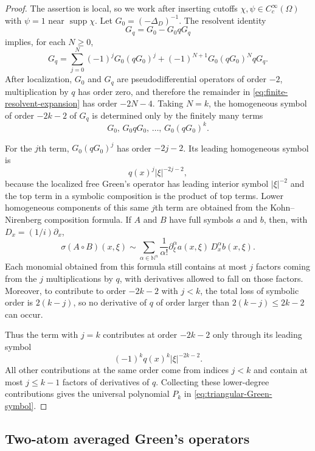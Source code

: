 \documentclass[11pt]{article}
\newcommand{\OmegaD}{\Omega}
\newcommand{\supp}{\operatorname{supp}}
\theoremstyle{plain}
\theoremstyle{definition}
\theoremstyle{remark}
\begin{document}
\begin{proof}
The assertion is local, so we work after inserting cutoffs
$\chi,\psi\in C_c^\infty(\OmegaD)$ with $\psi=1$ near $\supp\chi$.
Let $G_0=(-\Delta_D)^{-1}$.  The resolvent identity
\[
  G_q=G_0-G_0qG_q
\]
implies, for each $N\ge0$,
\begin{equation}\label{eq:finite-resolvent-expansion}
  G_q=\sum_{j=0}^N(-1)^jG_0(qG_0)^j
       +(-1)^{N+1}G_0(qG_0)^NqG_q .
\end{equation}
After localization, $G_0$ and $G_q$ are pseudodifferential operators of order $-2$, multiplication by $q$ has order zero, and therefore the remainder in \eqref{eq:finite-resolvent-expansion} has order $-2N-4$.  Taking $N=k$, the homogeneous symbol of order $-2k-2$ of $G_q$ is determined only by the finitely many terms
\[
  G_0,\, G_0qG_0,\,\dots,\, G_0(qG_0)^k .
\]

For the $j$th term, $G_0(qG_0)^j$ has order $-2j-2$.  Its leading homogeneous symbol is
\[
  q(x)^j|\xi|^{-2j-2},
\]
because the localized free Green's operator has leading interior symbol $|\xi|^{-2}$ and the top term in a symbolic composition is the product of top terms.  Lower homogeneous components of this same $j$th term are obtained from the Kohn--Nirenberg composition formula.  If $A$ and $B$ have full symbols $a$ and $b$, then, with $D_x=(1/i)\partial_x$,
\[
  \sigma(A\circ B)(x,\xi)
  \sim
  \sum_{\alpha\in\mathbb N^n}\frac1{\alpha!}
  \partial_\xi^\alpha a(x,\xi)\,D_x^\alpha b(x,\xi).
\]
Each monomial obtained from this formula still contains at most $j$ factors coming from the $j$ multiplications by $q$, with derivatives allowed to fall on those factors.  Moreover, to contribute to order $-2k-2$ with $j<k$, the total loss of symbolic order is $2(k-j)$, so no derivative of $q$ of order larger than $2(k-j)\le 2k-2$ can occur.

Thus the term with $j=k$ contributes at order $-2k-2$ only through its leading symbol
\[
  (-1)^kq(x)^k|\xi|^{-2k-2}.
\]
All other contributions at the same order come from indices $j<k$ and contain at most $j\le k-1$ factors of derivatives of $q$.  Collecting these lower-degree contributions gives the universal polynomial $P_k$ in \eqref{eq:triangular-Green-symbol}.
\end{proof}


\subsection{Two-atom averaged Green's operators}
\end{document}
